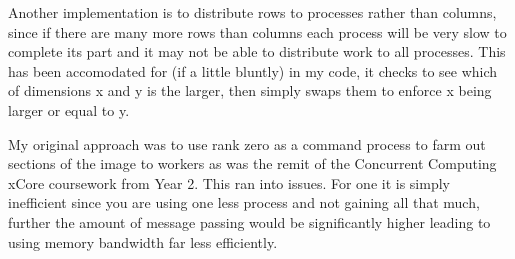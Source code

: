 \documentclass[10pt]{article}
\begin{document}
    Another implementation is to distribute rows to processes rather than columns, since if there are many more rows than columns each process will be very slow
    to complete its part and it may not be able to distribute work to all processes. This has been accomodated for (if a little bluntly) in my code, it checks to
    see which of dimensions x and y is the larger, then simply swaps them to enforce x being larger or equal to y.

    My original approach was to use rank zero as a command process to farm out sections of the image to workers as was the remit of the Concurrent Computing
    xCore coursework from Year 2. This ran into issues. For one it is simply inefficient since you are using one less process and not gaining all that much,
    further the amount of message passing would be significantly higher leading to using memory bandwidth far less efficiently. 












  
\end{document}
